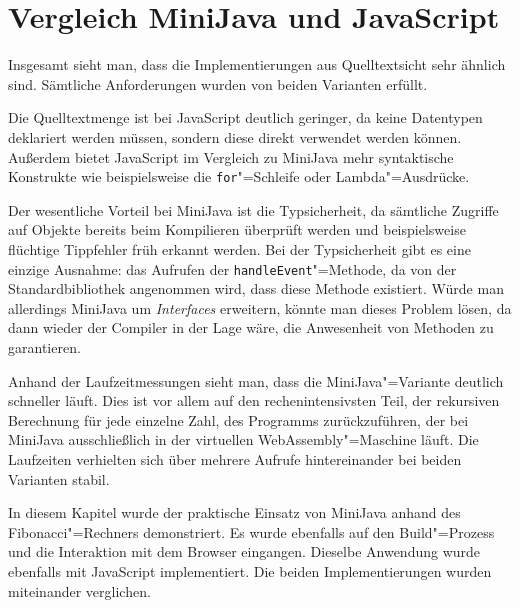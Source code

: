 \section{Vergleich MiniJava und JavaScript}

Insgesamt sieht man, dass die Implementierungen aus Quelltextsicht sehr ähnlich sind. Sämtliche Anforderungen wurden von beiden Varianten erfüllt.

Die Quelltextmenge ist bei JavaScript deutlich geringer, da keine Datentypen deklariert werden müssen, sondern diese direkt verwendet werden können. Außerdem bietet JavaScript im Vergleich zu MiniJava mehr syntaktische Konstrukte wie beispielsweise die \lstinline{for}"=Schleife oder Lambda"=Ausdrücke. 

Der wesentliche Vorteil bei MiniJava ist die Typsicherheit, da sämtliche Zugriffe auf Objekte bereits beim Kompilieren überprüft werden und beispielsweise flüchtige Tippfehler früh erkannt werden. Bei der Typsicherheit gibt es eine einzige Ausnahme: das Aufrufen der \lstinline{handleEvent}"=Methode, da von der Standardbibliothek angenommen wird, dass diese Methode existiert. Würde man allerdings MiniJava um \emph{Interfaces} erweitern, könnte man dieses Problem lösen, da dann wieder der Compiler in der Lage wäre, die Anwesenheit von Methoden zu garantieren.

Anhand der Laufzeitmessungen sieht man, dass die MiniJava"=Variante deutlich schneller läuft. Dies ist vor allem auf den rechenintensivsten Teil, der rekursiven Berechnung für jede einzelne Zahl, des Programms zurückzuführen, der bei MiniJava ausschließlich in der virtuellen WebAssembly"=Maschine läuft. Die Laufzeiten verhielten sich über mehrere Aufrufe hintereinander bei beiden Varianten stabil.

\vspace{4em}
In diesem Kapitel wurde der praktische Einsatz von MiniJava anhand des Fibonacci"=Rechners demonstriert. Es wurde ebenfalls auf den Build"=Prozess und die Interaktion mit dem Browser eingangen. Dieselbe Anwendung wurde ebenfalls mit JavaScript implementiert. Die beiden Implementierungen wurden miteinander verglichen.
